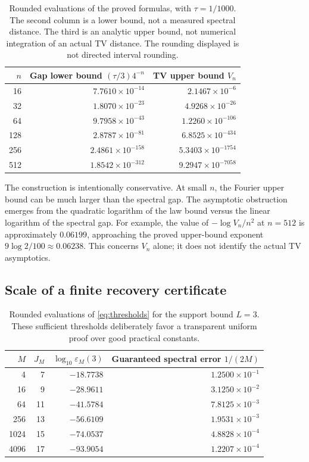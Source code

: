 \documentclass[11pt,a4paper]{article}
\numberwithin{equation}{section}
\theoremstyle{definition}
\theoremstyle{remark}
\newcommand{\eps}{\varepsilon}
\begin{document}
\begin{table}[htbp]
\centering\small
\begin{tabular}{@{}rrr@{}}
\toprule
$n$ & Gap lower bound $(\tau/3)4^{-n}$ & TV upper bound $V_n$\\
\midrule
16  & $7.7610\times10^{-14}$  & $2.1467\times10^{-6}$\\
32  & $1.8070\times10^{-23}$  & $4.9268\times10^{-26}$\\
64  & $9.7958\times10^{-43}$  & $1.2260\times10^{-106}$\\
128 & $2.8787\times10^{-81}$  & $6.8525\times10^{-434}$\\
256 & $2.4861\times10^{-158}$ & $5.3403\times10^{-1754}$\\
512 & $1.8542\times10^{-312}$ & $9.2947\times10^{-7058}$\\
\bottomrule
\end{tabular}
\caption{Rounded evaluations of the proved formulas, with $\tau=1/1000$.
The second column is a lower bound, not a measured spectral distance.
The third is an analytic upper bound, not numerical integration of an actual
TV distance. The rounding displayed is not directed interval rounding.}
\label{tab:lower-numeric}
\end{table}

The construction is intentionally conservative. At small $n$, the Fourier
upper bound can be much larger than the spectral gap. The asymptotic
obstruction emerges from the quadratic logarithm of the law bound versus the
linear logarithm of the spectral gap. For example, the value of
$-\log V_n/n^2$ at $n=512$ is approximately $0.06199$, approaching the
proved upper-bound exponent $9\log2/100\approx0.06238$.
This concerns $V_n$ alone; it does not identify the actual TV asymptotics.

\subsection{Scale of a finite recovery certificate}

\begin{table}[htbp]
\centering\small
\begin{tabular}{@{}rrrr@{}}
\toprule
$M$ & $J_M$ & $\log_{10}\eps_M(3)$ & Guaranteed spectral error $1/(2M)$\\
\midrule
4    & 7  & $-18.7738$ & $1.2500\times10^{-1}$\\
16   & 9  & $-28.9611$ & $3.1250\times10^{-2}$\\
64   & 11 & $-41.5784$ & $7.8125\times10^{-3}$\\
256  & 13 & $-56.6109$ & $1.9531\times10^{-3}$\\
1024 & 15 & $-74.0537$ & $4.8828\times10^{-4}$\\
4096 & 17 & $-93.9054$ & $1.2207\times10^{-4}$\\
\bottomrule
\end{tabular}
\caption{Rounded evaluations of \eqref{eq:thresholds} for the support bound
$L=3$. These sufficient thresholds deliberately favor a transparent uniform
proof over good practical constants.}
\label{tab:upper-numeric}
\end{table}
\end{document}
